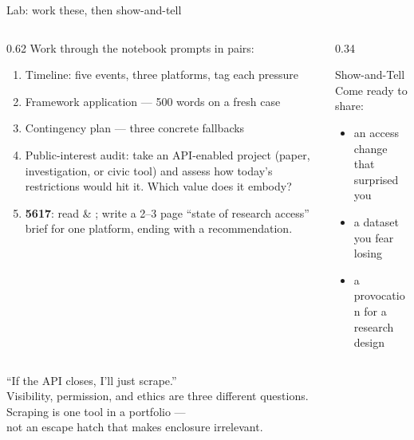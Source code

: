 \documentclass[9pt,aspectratio=169]{beamer}
\begin{document}
\begin{frame}{Lab: work these, then show-and-tell}
    \begin{columns}[T]
        \begin{column}{0.62\textwidth}
            Work through the notebook prompts in pairs:
            \begin{enumerate}\small
                \item Timeline: five events, three platforms, tag each pressure
                \item Framework application --- 500 words on a fresh case
                \item Contingency plan --- three concrete fallbacks
                \item Public-interest audit: take an API-enabled project (paper, investigation, or civic tool) and assess how today's restrictions would hit it. Which value does it embody?
                \item[5.] \textcolor{tab-purple}{\textbf{5617}}: read \textcite{davidson2023platform} \& \textcite{perriam2020digital}; write a 2--3 page ``state of research access'' brief for one platform, ending with a recommendation.
            \end{enumerate}
        \end{column}
        \begin{column}{0.34\textwidth}
            \begin{block}{Show-and-Tell}
                \footnotesize Come ready to share:
                \begin{itemize}\footnotesize
                    \item an access change that surprised you
                    \item a dataset you fear losing
                    \item a provocation for a research design
                \end{itemize}
            \end{block}
        \end{column}
    \end{columns}
\end{frame}

\begin{frame}[standout]
    ``If the API closes, I'll just scrape.''\\[0.6em]
    {\large Visibility, permission, and ethics are three different questions.}\\[1em]
    Scraping is one tool in a portfolio ---\\
    not an escape hatch that makes enclosure irrelevant.
\end{frame}
\end{document}
